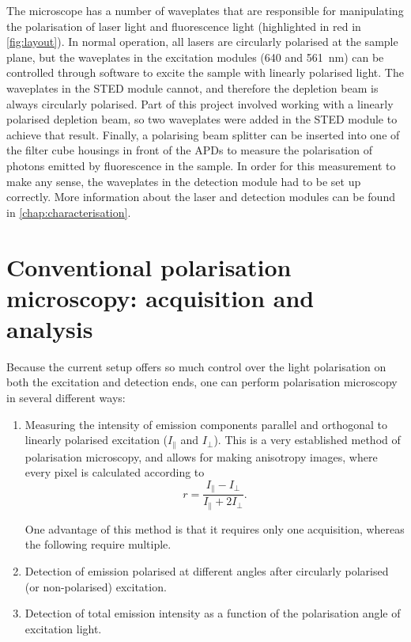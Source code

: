 The microscope has a number of waveplates that are responsible for manipulating the polarisation of laser light and fluorescence light (highlighted in red in \autoref{fig:layout}). In normal operation, all lasers are circularly polarised at the sample plane, but the waveplates in the excitation modules (640 and 561~nm) can be controlled through software to excite the sample with linearly polarised light. The waveplates in the STED module cannot, and therefore the depletion beam is always circularly polarised. Part of this project involved working with a linearly polarised depletion beam, so two waveplates were added in the STED module to achieve that result. Finally, a polarising beam splitter can be inserted into one of the filter cube housings in front of the APDs to measure the polarisation of photons emitted by fluorescence in the sample. In order for this measurement to make any sense, the waveplates in the detection module had to be set up correctly. More information about the laser and detection modules can be found in \autoref{chap:characterisation}.

\section{Conventional polarisation microscopy: acquisition and analysis}
\label{sec:pol analysis}
 
Because the current setup offers so much control over the light polarisation on both the excitation and detection ends, one can perform polarisation microscopy in several different ways:
\begin{enumerate}
	\item Measuring the intensity of emission components parallel and orthogonal to linearly polarised excitation ($ I_\parallel $ and $ I_\perp $). This is a very established method of polarisation microscopy, and allows for making anisotropy images, where every pixel is calculated according to
	\begin{equation}
		r=\frac{I_\parallel - I_\perp}{I_\parallel + 2I_\perp}.
	\end{equation}
	
	One advantage of this method is that it requires only one acquisition, whereas the following require multiple.
	
	\item Detection of emission polarised at different angles after circularly polarised (or non-polarised) excitation.
	
	\item Detection of total emission intensity as a function of the polarisation angle of excitation light.
\end{enumerate}

